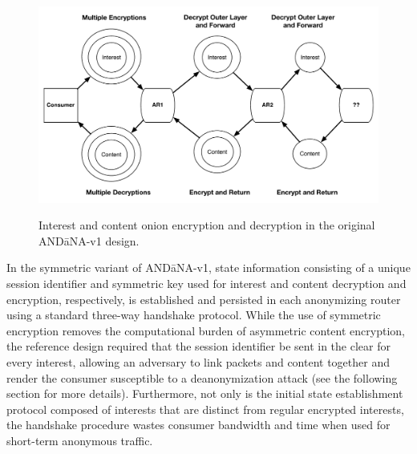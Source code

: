 \begin{figure}
\begin{center}
\includegraphics[scale=0.34]{./images/andana_v1_design.pdf}
\label{fig:andanav1_design}
\caption{Interest and content onion encryption and decryption in the original {\sf AND\=aNA-v1} design.}
\end{center}
\end{figure}

In the symmetric variant of {\sf AND\=aNA-v1}, state information consisting of a unique session identifier and symmetric key used for interest and content decryption and encryption, respectively, is established and persisted in each anonymizing router using a standard three-way handshake protocol. While the use of symmetric encryption removes the computational burden of asymmetric content encryption, the reference design required that the session identifier be sent in the clear for every interest, allowing an adversary to link packets and content together and render the consumer susceptible to a deanonymization attack (see the following section for more details). Furthermore, not only is the initial state establishment protocol composed of interests that are distinct from regular encrypted interests, the handshake procedure wastes consumer bandwidth and time when used for short-term anonymous traffic. 


